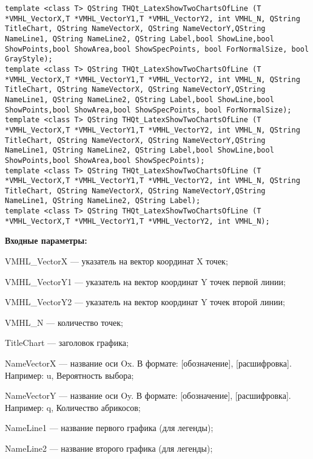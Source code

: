 \documentclass[a4paper,12pt]{article}
\begin{document}
\begin{lstlisting}[label=code_syntax_THQt_LatexShowTwoChartsOfLine,caption=Синтаксис]
template <class T> QString THQt_LatexShowTwoChartsOfLine (T *VMHL_VectorX,T *VMHL_VectorY1,T *VMHL_VectorY2, int VMHL_N, QString TitleChart, QString NameVectorX, QString NameVectorY,QString NameLine1, QString NameLine2, QString Label,bool ShowLine,bool ShowPoints,bool ShowArea,bool ShowSpecPoints, bool ForNormalSize, bool GrayStyle);
template <class T> QString THQt_LatexShowTwoChartsOfLine (T *VMHL_VectorX,T *VMHL_VectorY1,T *VMHL_VectorY2, int VMHL_N, QString TitleChart, QString NameVectorX, QString NameVectorY,QString NameLine1, QString NameLine2, QString Label,bool ShowLine,bool ShowPoints,bool ShowArea,bool ShowSpecPoints, bool ForNormalSize);
template <class T> QString THQt_LatexShowTwoChartsOfLine (T *VMHL_VectorX,T *VMHL_VectorY1,T *VMHL_VectorY2, int VMHL_N, QString TitleChart, QString NameVectorX, QString NameVectorY,QString NameLine1, QString NameLine2, QString Label,bool ShowLine,bool ShowPoints,bool ShowArea,bool ShowSpecPoints);
template <class T> QString THQt_LatexShowTwoChartsOfLine (T *VMHL_VectorX,T *VMHL_VectorY1,T *VMHL_VectorY2, int VMHL_N, QString TitleChart, QString NameVectorX, QString NameVectorY,QString NameLine1, QString NameLine2, QString Label);
template <class T> QString THQt_LatexShowTwoChartsOfLine (T *VMHL_VectorX,T *VMHL_VectorY1,T *VMHL_VectorY2, int VMHL_N);
\end{lstlisting}

\textbf{Входные параметры:}
 
    VMHL\_VectorX --- указатель на вектор координат X точек;
 
    VMHL\_VectorY1 --- указатель на вектор координат Y точек первой линии;
 
    VMHL\_VectorY2 --- указатель на вектор координат Y точек второй линии;
 
    VMHL\_N --- количество точек;
 
    TitleChart --- заголовок графика;
 
    NameVectorX --- название оси Ox. В формате: [обозначение], [расшифровка]. Например: u, Вероятность выбора;
 
    NameVectorY --- название оси Oy. В формате: [обозначение], [расшифровка]. Например: q, Количество абрикосов;
 
    NameLine1 --- название первого графика (для легенды);
 
    NameLine2 --- название второго графика (для легенды);
 
\end{document}
